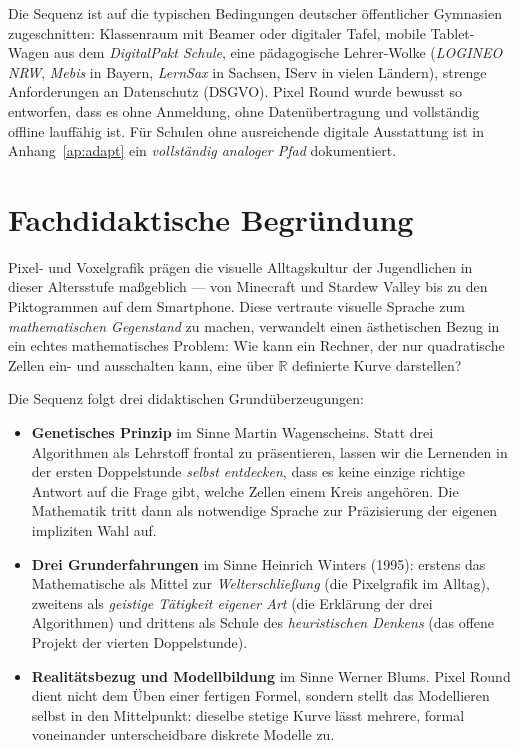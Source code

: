 \documentclass[12pt,a4paper]{scrartcl}
\newcommand{\acc}[1]{\textcolor{accent}{\textbf{#1}}}
\begin{document}
\begin{hinweis}
Die Sequenz ist auf die typischen Bedingungen deutscher öffentlicher Gymnasien zugeschnitten: Klassenraum mit Beamer oder digitaler Tafel, mobile Tablet-Wagen aus dem \emph{DigitalPakt Schule}, eine pädagogische Lehrer-Wolke (\emph{LOGINEO NRW}, \emph{Mebis} in Bayern, \emph{LernSax} in Sachsen, IServ in vielen Ländern), strenge Anforderungen an Datenschutz (DSGVO). Pixel Round wurde bewusst so entworfen, dass es ohne Anmeldung, ohne Datenübertragung und vollständig offline lauffähig ist. Für Schulen ohne ausreichende digitale Ausstattung ist in Anhang~\ref{ap:adapt} ein \emph{vollständig analoger Pfad} dokumentiert.
\end{hinweis}

\section{Fachdidaktische Begründung}

Pixel- und Voxelgrafik prägen die visuelle Alltagskultur der Jugendlichen in dieser Altersstufe maßgeblich --- von Minecraft und Stardew Valley bis zu den Piktogrammen auf dem Smartphone. Diese vertraute visuelle Sprache zum \emph{mathematischen Gegenstand} zu machen, verwandelt einen ästhetischen Bezug in ein echtes mathematisches Problem: Wie kann ein Rechner, der nur quadratische Zellen ein- und ausschalten kann, eine über $\mathbb{R}$ definierte Kurve darstellen?

Die Sequenz folgt drei didaktischen Grundüberzeugungen:

\begin{itemize}[leftmargin=1.3em,itemsep=0.15em,topsep=0.3em]
  \item \acc{Genetisches Prinzip} im Sinne Martin Wagenscheins. Statt drei Algorithmen als Lehrstoff frontal zu präsentieren, lassen wir die Lernenden in der ersten Doppelstunde \emph{selbst entdecken}, dass es keine einzige richtige Antwort auf die Frage gibt, welche Zellen einem Kreis angehören. Die Mathematik tritt dann als notwendige Sprache zur Präzisierung der eigenen impliziten Wahl auf.
  \item \acc{Drei Grunderfahrungen} im Sinne Heinrich Winters (1995): erstens das Mathematische als Mittel zur \emph{Welterschließung} (die Pixelgrafik im Alltag), zweitens als \emph{geistige Tätigkeit eigener Art} (die Erklärung der drei Algorithmen) und drittens als Schule des \emph{heuristischen Denkens} (das offene Projekt der vierten Doppelstunde).
  \item \acc{Realitätsbezug und Modellbildung} im Sinne Werner Blums. Pixel Round dient nicht dem Üben einer fertigen Formel, sondern stellt das Modellieren selbst in den Mittelpunkt: dieselbe stetige Kurve lässt mehrere, formal voneinander unterscheidbare diskrete Modelle zu.
\end{itemize}
\end{document}
